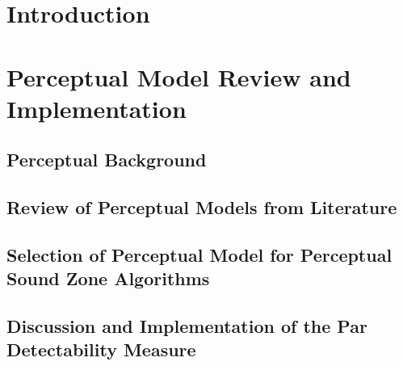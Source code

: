 \documentclass[10pt,twoside,openright,titlepage]{ce}
\begin{document}
\frontmatter
\makecover
\maketitle
\makesignature


\tableofcontents
\mainmatter

\chapter{Introduction}
\label{ch:introduction}


\newpage


\chapter{Perceptual Model Review and Implementation}
\label{ch:perceptual}
% 
\section{Perceptual Background}
\label{ch:perceptual:background}

\newpage
\section{Review of Perceptual Models from Literature}
\label{ch:perceptual:review}

\newpage
\section{Selection of Perceptual Model for Perceptual Sound Zone Algorithms}
\label{ch:perceptual:selection}

\newpage
\section{Discussion and Implementation of the Par Detectability Measure}
\label{ch:perceptual:implementation}

\newpage
% 
\end{document}
